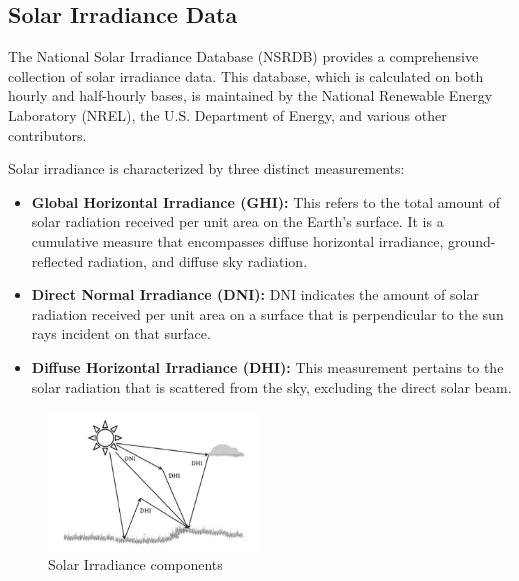 \documentclass[a4paper,12pt]{Classes/RoboticsLaTeX}
\begin{document}
	\subsection{ Solar Irradiance Data}

	The National Solar Irradiance Database (NSRDB) provides a comprehensive collection of solar irradiance data. This database, which is calculated on both hourly and 
	half-hourly bases, is maintained by the National Renewable Energy Laboratory (NREL), the U.S. Department of Energy, and various other contributors\cite{sengupta2018}. 

	Solar irradiance is characterized by three distinct measurements:

	\begin{itemize}
		\item \textbf{Global Horizontal Irradiance (GHI):} This refers to the total amount of solar radiation received per unit area on the Earth's surface. It is a cumulative measure that encompasses diffuse horizontal irradiance, ground-reflected radiation, and diffuse sky radiation.
		
		\item \textbf{Direct Normal Irradiance (DNI):} DNI indicates the amount of solar radiation received per unit area on a surface that is perpendicular to the sun rays incident on that surface.
		
		\item \textbf{Diffuse Horizontal Irradiance (DHI):} This measurement pertains to the solar radiation that is scattered from the sky, excluding the direct solar beam.
	\end{itemize}

	\begin{figure}[H]
		\centering
		\includegraphics[width=0.5\textwidth]{Figures/Solar Irradiance.png} %
		\caption{Solar Irradiance components\cite{vignola2023}}
		\label{fig:my_label3} %
	\end{figure}
\end{document}
